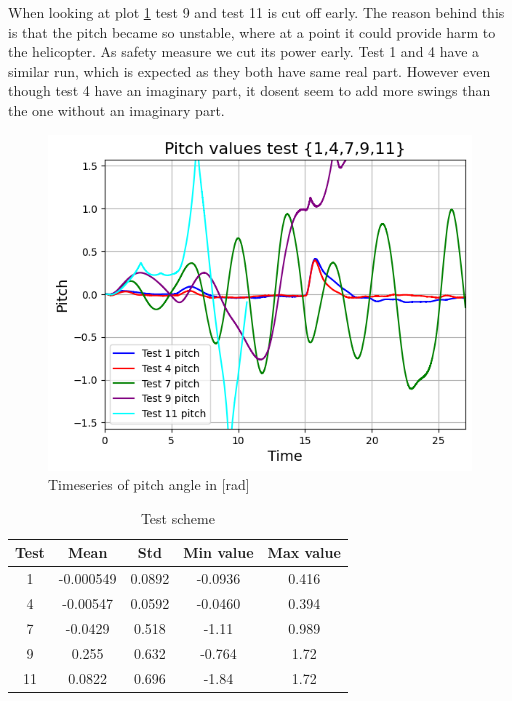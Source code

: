 When looking at plot \ref{fig:pitch_plot} test 9 and test 11 is cut off early. The reason behind this is that 
the pitch became so unstable, where at a point it could provide harm to the helicopter. As safety measure we cut its power early. 
Test 1 and 4 have a similar run, which is expected as they both have same real part. However even though test 4 have an imaginary part, 
it dosent seem to add more swings than the one without an imaginary part.

\begin{figure}[h]
\centering
\includegraphics[width=1\textwidth]{figures/pitchlab1.png}
\caption{Timeseries of pitch angle in [rad]}
\label{fig:pitch_plot}
\end{figure}

\begin{table}[h]
    \centering
        \begin{tabular}{||c c c c c||} 
         \hline
         Test & Mean & Std & Min value & Max value \\ [0.5ex] 
         \hline\hline
         1 & -0.000549 & 0.0892 & -0.0936 & 0.416  \\ 
         \hline
         4 & -0.00547 & 0.0592 & -0.0460 & 0.394 \\
         \hline
         7 & -0.0429 & 0.518 & -1.11 & 0.989  \\
         \hline
         9 & 0.255 & 0.632 & -0.764 & 1.72 \\
         \hline
         11 & 0.0822 & 0.696 & -1.84 &1.72 \\[1ex]
         \hline
        \end{tabular}
        \label{tab:testskjema_lab1}
        \caption{Test scheme}
    \end{table}


